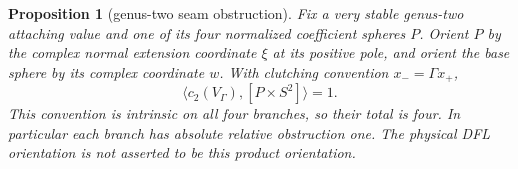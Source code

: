 \documentclass[11pt]{amsart}
\newtheorem{proposition}[theorem]{Proposition}
\theoremstyle{definition}
\theoremstyle{remark}
\theoremstyle{plain}
\begin{document}
\begin{proposition}[genus-two seam obstruction]
\label{prop:genus-two-seam-obstruction}
Fix a very stable genus-two attaching value and one of its
four normalized coefficient spheres $P$.
Orient $P$ by the complex normal extension coordinate $\xi$
at its positive pole, and orient the base sphere by its complex
coordinate $w$. With clutching convention $x_-=\Gamma x_+$,
\begin{equation}\label{eq:genus-two-seam-degree}
             \langle c_2(V_\Gamma),[P\times S^2]\rangle=1.
\end{equation}
This convention is intrinsic on all four branches, so their
total is four. In particular each branch has absolute
relative obstruction one. The physical DFL orientation is
not asserted to be this product orientation.
\end{proposition}
\end{document}
